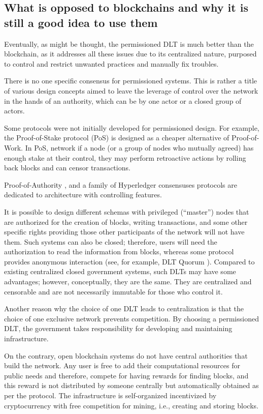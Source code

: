 \begin{multicols}{2}
\subsection{What is opposed to blockchains and why it is still a good idea to use them}\label{subsubsec-03.2}

Eventually, as might be thought, the permissioned DLT is much better than the blockchain, as it addresses all these issues due to its centralized nature, purposed to control and restrict unwanted practices and manually fix troubles.

There is no one specific consensus for permissioned systems. This is rather a title of various design concepts aimed to leave the leverage of control over the network in the hands of an authority, which can be by one actor or a closed group of actors.

Some protocols were not initially developed for permissioned design. For example, the Proof-of-Stake protocol (PoS) \cite{art1-key20} is designed as a cheaper alternative of Proof-of-Work. In PoS, network if a node (or a group of nodes who mutually agreed) has enough stake at their control, they may perform retroactive actions by rolling back blocks \cite{art1-key21} and can censor transactions.

Proof-of-Authority \cite{art1-key22}, and a family of Hyperledger consensuses \cite{art1-key23} protocols are dedicated to architecture with controlling features.

It is possible to design different schemas with privileged (“master”) nodes that are authorized for the creation of blocks, writing transactions, and some other specific rights providing those other participants of the network will not have them. Such systems can also be closed; therefore, users will need the authorization to read the information from blocks, whereas some protocol provides anonymous interaction (see, for example, DLT Quorum \cite{art1-key24}). Compared to existing centralized closed government systems, such DLTs may have some advantages; however, conceptually, they are the same. They are centralized and censorable and are not necessarily immutable for those who control it.

Another reason why the choice of one DLT leads to centralization is that the choice of one exclusive network prevents competition. By choosing a permissioned DLT, the government takes responsibility for developing and maintaining infrastructure.

On the contrary, open blockchain systems do not have central authorities that build the network. Any user is free to add their computational resources for public needs and therefore, compete for having rewards for finding blocks, and this reward is not distributed by someone centrally but automatically obtained as per the protocol. The infrastructure is self-organized incentivized by cryptocurrency with free competition for mining, i.e., creating and storing blocks.


\end{multicols}
